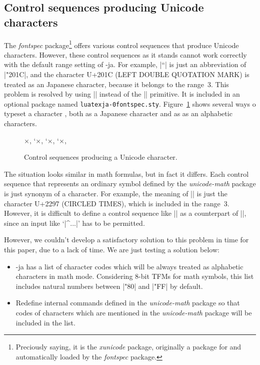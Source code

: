\documentclass{ajt}
\begin{document}
\subsection{Control sequences producing Unicode characters}
\label{ssec-unichar}

The \emph{fontspec} package\footnote{Preciously saying, it is the
\emph{xunicode} package, originally a package for \XeTeX and
automatically loaded by the \emph{fontspec} package.} offers various
control sequences that produce Unicode characters.  However, these
control sequences as it stands cannot work correctly with the default
range setting of \LuaTeX-ja.  For example, |\textquotedblleft| is just
an abbreviation of |\char"201C\relax|, and the character U+201C (LEFT %
DOUBLE QUOTATION MARK) is treated as an Japanese character, because it
belongs to the range~3.  This problem is resolved by using |\ltjalchar|
instead of the |\char| primitive.  It is included in an optional package
named \texttt{luatexja-\penalty0fontspec.sty}.  Figure~\ref{fig-unitxt}
shows several ways o typeset a character , both as a Japanese character
and as as an alphabetic characters.

\begin{figure}
\begin{LTXexample}
×, \char`×,   %
\ltjalchar`×, %
\ltjjachar`×, %
\texttimes     %
\end{LTXexample}
\caption{Control sequences producing a Unicode character.}
\label{fig-unitxt}
\end{figure}

The situation looks similar in math formulas, but in fact it differs.
Each control sequence that represents an ordinary symbol defined by the
\emph{unicode-math} package is just synonym of a character. For example,
the meaning of |\otimes| is just the character U+2297 (CIRCLED TIMES),
which is included in the range~3.  However, it is difficult to define a
control sequence like |\ltjalUmathchar| as a counterpart of
|\Umathchar|, since an input like `|\sum^\ltjalUmathchar ...|' has to be
permitted.

However, we couldn't develop a satisfactory solution to this problem in
time for this paper, due to a lack of time. We are just testing a
solution below:
\begin{itemize}
\item \LuaTeX-ja has a list of character codes which will be always treated as
      alphabetic characters in math mode. Considering 8-bit TFMs for
      math symbols, this list includes natural numbers between |"80| and
      |"FF| by default.
\item Redefine internal commands defined in the \emph{unicode-math}
      package so that
codes of characters which are mentioned in the \emph{unicode-math}
      package will be included in the list.
\end{itemize}
\end{document}
